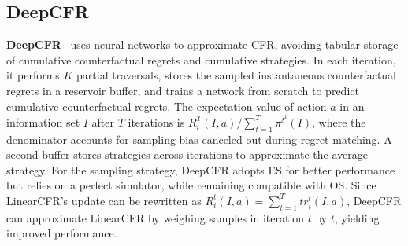 \documentclass[letterpaper]{article} %
\begin{document}
\subsection{DeepCFR}
\textbf{DeepCFR}~\cite{brown2019deep} uses neural networks to approximate CFR, avoiding tabular storage of cumulative counterfactual regrets and cumulative strategies. In each iteration, it performs $K$ partial traversals, stores the sampled instantaneous counterfactual regrets in a reservoir buffer, and trains a network from scratch to predict cumulative counterfactual regrets. The expectation value of action $a$ in an information set $I$ after $T$ iterations is $R_i^T(I, a)/\sum_{t=1}^{T}\pi^{\xi^t}(I)$, where the denominator accounts for sampling bias canceled out during regret matching.
A second buffer stores strategies across iterations to approximate the average strategy. For the sampling strategy, DeepCFR adopts ES for better performance but relies on a perfect simulator, while remaining compatible with OS. Since LinearCFR's update can be rewritten as $R_i^t(I, a)=\sum_{t=1}^{T}tr_i^t(I, a)$, DeepCFR can approximate LinearCFR by weighing samples in iteration $t$ by $t$, yielding improved performance. 
\end{document}
